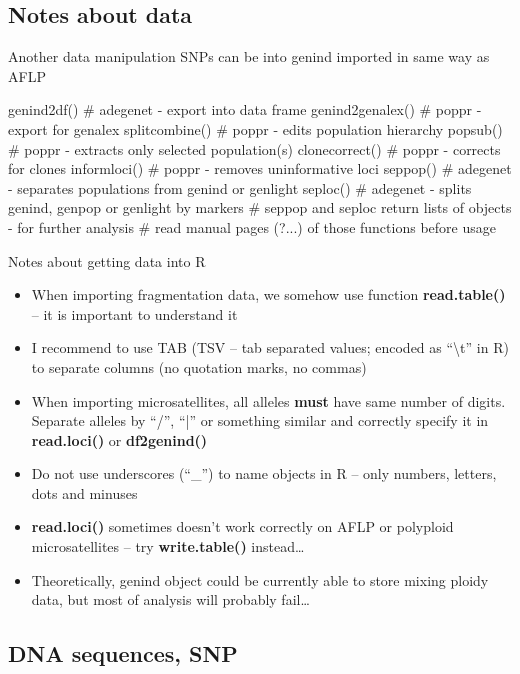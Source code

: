 \documentclass[compress, ucs, xelatex, 11pt, xcolor=svgnames,
  hyperref={
    bookmarks=true,
    unicode=true,
    colorlinks=true,
    pdftitle={Molecular data in R},
    plainpages=false,
    pdfauthor={Vojtech Zeisek},
    pdfsubject={Course about phylogeny and evolution in R},
    pdfcreator={XeLaTeX},
    pdfkeywords={R, evolution, phylogeny, molecular data},
    linkcolor=Tomato,
    anchorcolor=SaddleBrown,
    citecolor=Goldenrod,
    filecolor=DarkMagenta,
    menucolor=Sienna,
    urlcolor=DarkTurquoise,
    pdftex},
  url={hyphens, lowtilde} %
  ]{beamer}
\begin{document}
\subsection{Notes about data}

\begin{frame}[fragile]{Another data manipulation}
SNPs can be into genind imported in same way as AFLP
  \begin{spluscode}
    genind2df() # adegenet - export into data frame
    genind2genalex() # poppr - export for genalex
    splitcombine() # poppr - edits population hierarchy
    popsub() # poppr - extracts only selected population(s)
    clonecorrect() # poppr - corrects for clones
    informloci() # poppr - removes uninformative loci
    seppop() # adegenet - separates populations from genind or genlight
    seploc() # adegenet - splits genind, genpop or genlight by markers
    # seppop and seploc return lists of objects - for further analysis
    # read manual pages (?...) of those functions before usage
  \end{spluscode}
\end{frame}

\begin{frame}{Notes about getting data into R}
\begin{itemize}
 \item When importing fragmentation data, we somehow use function \textbf{read.table()} -- it is important to understand it
 \item I recommend to use TAB (TSV -- tab separated values; encoded as ``\textbackslash t'' in R) to separate columns (no quotation marks, no commas)
 \item When importing microsatellites, all alleles \textbf{must} have same number of digits. Separate alleles by ``/'', ``|'' or something similar and correctly specify it in \textbf{read.loci()} or \textbf{df2genind()}
 \item Do not use underscores (``\_'') to name objects in R -- only numbers, letters, dots and minuses
 \item \textbf{read.loci()} sometimes doesn't work correctly on AFLP or polyploid microsatellites -- try \textbf{write.table()} instead\ldots
 \item Theoretically, genind object could be currently able to store mixing ploidy data, but most of analysis will probably fail\ldots
\end{itemize}
\end{frame}

\subsection{DNA sequences, SNP}
\end{document}
